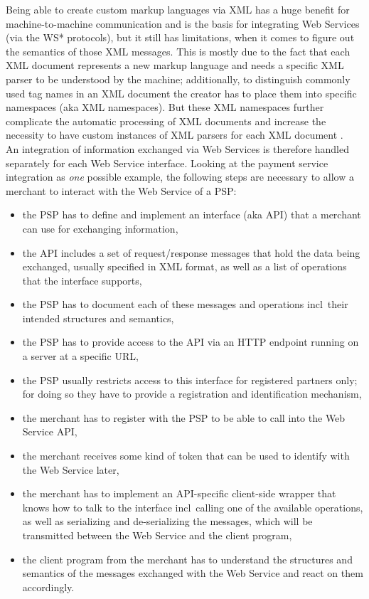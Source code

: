 Being able to create custom markup languages via \gls{XML} has a huge benefit for machine-to-machine communication and is the basis for integrating Web Services (via the WS* protocols), but it still has limitations, when it comes to figure out the semantics of those \gls{XML} messages. This is mostly due to the fact that each \gls{XML} document represents a new markup language and needs a specific \gls{XML} parser to be understood by the machine; additionally, to distinguish commonly used tag names in an \gls{XML} document the creator has to place them into specific namespaces (aka \gls{XML} namespaces). But these \gls{XML} namespaces further complicate the automatic processing of \gls{XML} documents and increase the necessity to have custom instances of \gls{XML} parsers for each \gls{XML} document \citep{taylor2008p2p}. \\

An integration of information exchanged via Web Services is therefore handled separately for each Web Service interface. Looking at the payment service integration as \emph{one} possible example, the following steps are necessary to allow a merchant to interact with the Web Service of a \gls{PSP}: \@

\begin{itemize}
  \item the \gls{PSP} has to define and implement an interface (aka \gls{API}) that a merchant can use for exchanging information,
  \item the \gls{API} includes a set of request/response messages that hold the data being exchanged, usually specified in \gls{XML} format, as well as a list of operations that the interface supports,
  \item the \gls{PSP} has to document each of these messages and operations \gls{incl}\ their intended structures and semantics,
  \item the \gls{PSP} has to provide access to the \gls{API} via an \gls{HTTP} endpoint running on a server at a specific \gls{URL},
  \item the \gls{PSP} usually restricts access to this interface for registered partners only; for doing so they have to provide a registration and identification mechanism,
  \item the merchant has to register with the \gls{PSP} to be able to call into the Web Service \gls{API},
  \item the merchant receives some kind of token that can be used to identify with the Web Service later,
  \item the merchant has to implement an \gls{API}-specific client-side wrapper that knows how to talk to the interface \gls{incl}\ calling one of the available operations, as well as serializing and de-serializing the messages, which will be transmitted between the Web Service and the client program,
  \item the client program from the merchant has to understand the structures and semantics of the messages exchanged with the Web Service and react on them accordingly.
\end{itemize}

